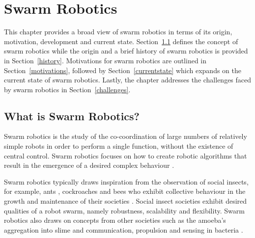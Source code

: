 
\chapter{Swarm Robotics}
\label{chap:first}


This chapter provides a broad view of swarm robotics in terms of its origin, motivation, development and current state.
Section~\ref{sec:first:definitionswarmrobotics} defines the concept of swarm robotics while the origin and a brief history of swarm robotics is provided in Section~\ref{history}. Motivations for swarm robotics are outlined in Section~\ref{motivations}, followed by Section~\ref{currentstate} which expands on the current state of swarm robotics. Lastly, the chapter addresses the challenges faced by swarm robotics in Section~\ref{challenges}.


\section{What is Swarm Robotics?}
\label{sec:first:definitionswarmrobotics}

Swarm robotics is the study of the co-coordination of large numbers of relatively simple robots in order to perform a single function, without the existence of central control. Swarm robotics focuses on how to create robotic algorithms that result in the emergence of a desired complex behaviour \cite{csahin2005swarm}.

Swarm robotics typically draws inspiration from the observation of social insects, for example, ants \cite{hoff2010two}, cockroaches \cite{garnier2005aggregation} and bees \cite{lee2012foraging} who exhibit collective behaviour in the growth and maintenance of their societies \cite{wilson1971insect}. Social insect societies exhibit desired qualities of a robot swarm, namely robustness, scalability and flexibility. Swarm robotics also draws on concepts from other societies such as the amoeba's aggregation into slime \cite{schmickl2007navigation} and communication, propulsion and sensing in bacteria \cite{dhariwal2004bacterium,martel2010using}. 

